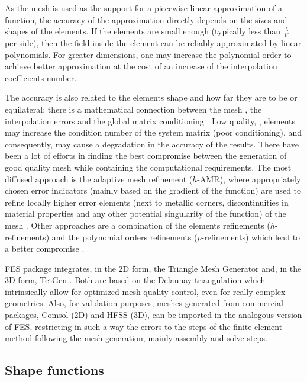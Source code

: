 As the mesh is used as the support for a piecewise linear approximation of a function, the accuracy of the approximation directly depends on the sizes and shapes of the elements. If the elements are small enough (typically less than $\frac{\lambda}{10}$ per side), then the field inside the element can be reliably approximated by linear polynomials. For greater dimensions, one may increase the polynomial order to achieve better approximation at the cost of an increase of the interpolation coefficients number.

The accuracy is also related to the elements shape and how far they are to be  or equilateral: there is a mathematical connection between the mesh , the interpolation errors and the global matrix conditioning \cite{tsukerman1998comparison}. Low quality, , elements may increase the condition number of the system matrix (poor conditioning), and consequently, may cause a degradation in the accuracy of the results. There have been a lot of efforts in finding the best compromise between the generation of good quality mesh while containing the computational requirements. The most diffused approach is the adaptive mesh refinement ($h$-AMR), where appropriately chosen error indicators (mainly based on the gradient of the function) are used to refine locally higher error elements (next to metallic corners, discontinuities in material properties and any other potential singularity of the function) of the mesh \cite{sun2000adaptive,ingelstrom2004higher}. Other approaches are a combination of the elements refinements ($h$-refinements) and the polynomial orders refinements ($p$-refinements) which lead to a better compromise \cite{solin2010adaptive}.

FES package integrates, in the 2D form, the Triangle Mesh Generator \cite{shewchuk2002delaunay} and, in the 3D form, TetGen \cite{si2008three}. Both are based on the Delaunay triangulation which intrinsically allow for optimized mesh quality control, even for really complex geometries. Also, for validation purposes, meshes generated from commercial packages, Comsol (2D) and HFSS (3D), can be imported  in the analogous version of FES, restricting in such a way the errors to the steps of the finite element method following the mesh generation, mainly assembly and solve steps.


\subsection{Shape functions}

